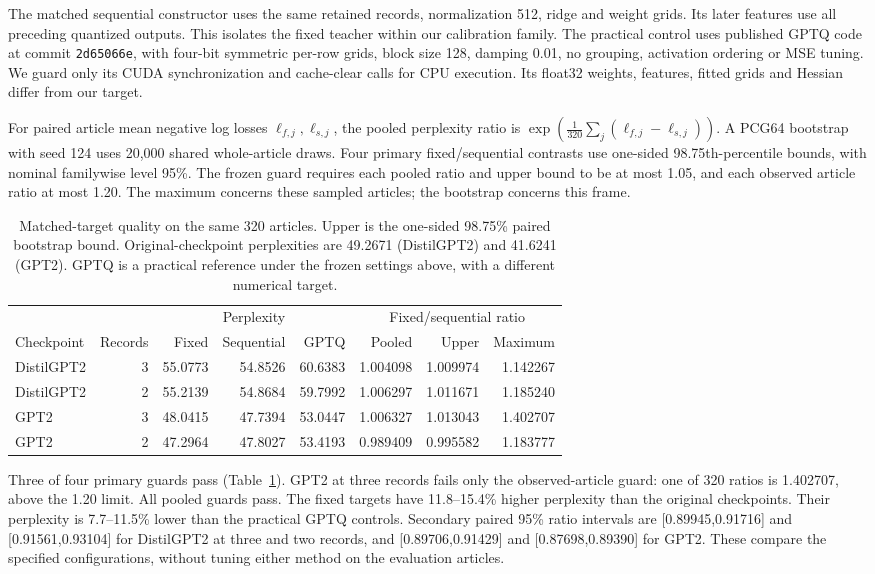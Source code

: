 \documentclass[11pt,a4paper]{article}
\begin{document}
The matched sequential constructor uses the same retained records, normalization
512, ridge and weight grids. Its later features use all preceding quantized
outputs. This isolates the fixed teacher within our calibration family.
The practical control uses published GPTQ code at commit
\texttt{2d65066e}, with four-bit symmetric per-row grids, block size 128,
damping 0.01, no grouping, activation ordering or MSE tuning. We guard only its
CUDA synchronization and cache-clear calls for CPU execution. Its float32 weights,
features, fitted grids and Hessian differ from our target.

For paired article mean negative log losses $\ell_{f,j},\ell_{s,j}$, the pooled
perplexity ratio is $\exp(\frac1{320}\sum_j(\ell_{f,j}-\ell_{s,j}))$.
A PCG64 bootstrap with seed 124 uses 20,000 shared whole-article draws.
Four primary fixed/sequential contrasts use one-sided 98.75th-percentile bounds,
with nominal familywise level 95\%. The frozen guard requires each pooled ratio
and upper bound to be at most 1.05, and each observed article ratio at most 1.20.
The maximum concerns these sampled articles; the bootstrap concerns this frame.

\begin{table}[t]
\centering\small
\begin{tabular}{@{}lrrrrrrr@{}}
\toprule
 & & \multicolumn{3}{c}{Perplexity} & \multicolumn{3}{c}{Fixed/sequential ratio} \\
Checkpoint & Records & Fixed & Sequential & GPTQ & Pooled & Upper & Maximum \\
\midrule
DistilGPT2 & 3 & 55.0773 & 54.8526 & 60.6383 & 1.004098 & 1.009974 & 1.142267 \\
DistilGPT2 & 2 & 55.2139 & 54.8684 & 59.7992 & 1.006297 & 1.011671 & 1.185240 \\
GPT2 & 3 & 48.0415 & 47.7394 & 53.0447 & 1.006327 & 1.013043 & 1.402707 \\
GPT2 & 2 & 47.2964 & 47.8027 & 53.4193 & 0.989409 & 0.995582 & 1.183777 \\
\bottomrule
\end{tabular}
\caption{Matched-target quality on the same 320 articles. Upper is the one-sided
98.75\% paired bootstrap bound. Original-checkpoint perplexities are 49.2671
(DistilGPT2) and 41.6241 (GPT2). GPTQ is a practical reference under the frozen
settings above, with a different numerical target.}
\label{tab:quality}
\end{table}

Three of four primary guards pass (Table~\ref{tab:quality}). GPT2 at three
records fails only the observed-article guard: one of 320 ratios is 1.402707,
above the 1.20 limit. All pooled guards pass.
The fixed targets have 11.8--15.4\% higher perplexity than the original checkpoints.
Their perplexity is 7.7--11.5\% lower than the practical GPTQ controls.
Secondary paired 95\% ratio intervals are
[0.89945,0.91716] and [0.91561,0.93104] for DistilGPT2 at three and two records,
and [0.89706,0.91429] and [0.87698,0.89390] for GPT2. These compare the specified
configurations, without tuning either method on the evaluation articles.
\end{document}
